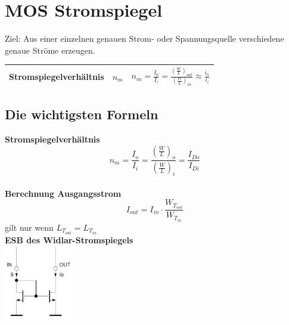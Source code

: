 \section{MOS Stromspiegel}
Ziel: Aus einer einzelnen genauen Strom- oder Spannungsquelle verschiedene genaue Ströme erzeugen.

\begin{tabularx}{\linewidth}{|l|l|X|}
	\hline
	Stromspiegelverhältnis & $n_m$ & $n_m = \frac{I_0}{I_i} = \frac{(\frac{W}{L})_{out}}{(\frac{W}{L})_{in}} \approx \frac{i_0}{i_i}$
	\\ \hline
\end{tabularx}

\subsection{Die wichtigsten Formeln}
\begin{multicols}{2}
	\textbf{Stromspiegelverhältnis}
	\[
		n_m = \frac{I_o}{I_i} 
			= \frac{\left(\frac{W}{L}\right)_o}{\left(\frac{W}{L}\right)_i}
			= \frac{I_{Do}}{I_{Di}}
	\]
	\\
		
	\textbf{Berechnung Ausgangsstrom}
	\[
		I_{out} = I_{in}\cdot\frac{W_{T_{out}}}{W_{T_{in}}}
	\]
	gilt nur wenn $L_{T_{out}} = L_{T_{in}}$ \\

	\columnbreak
	\textbf{ESB des Widlar-Stromspiegels} \\
		\includegraphics[width=3cm]{images/stromspiegel/widlar_n.png} \\
\end{multicols}


